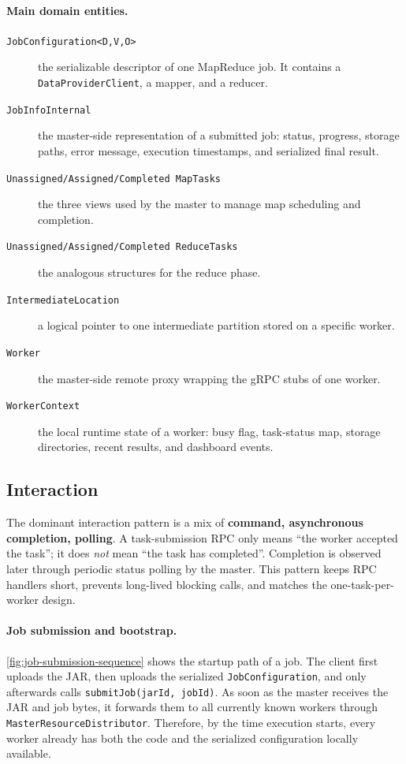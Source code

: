 \documentclass{scrartcl}
\begin{document}
\paragraph{Main domain entities.}
%
\begin{description}
    \item[\texttt{JobConfiguration<D,V,O>}] the serializable descriptor of one MapReduce job. It contains a \texttt{DataProviderClient}, a mapper, and a reducer.
    \item[\texttt{JobInfoInternal}] the master-side representation of a submitted job: status, progress, storage paths, error message, execution timestamps, and serialized final result.
    \item[\texttt{Unassigned/Assigned/Completed MapTasks}] the three views used by the master to manage map scheduling and completion.
    \item[\texttt{Unassigned/Assigned/Completed ReduceTasks}] the analogous structures for the reduce phase.
    \item[\texttt{IntermediateLocation}] a logical pointer to one intermediate partition stored on a specific worker.
    \item[\texttt{Worker}] the master-side remote proxy wrapping the gRPC stubs of one worker.
    \item[\texttt{WorkerContext}] the local runtime state of a worker: busy flag, task-status map, storage directories, recent results, and dashboard events.
\end{description}

\subsection{Interaction}\label{interaction}
The dominant interaction pattern is a mix of \textbf{command, asynchronous completion, polling}. A task-submission RPC only means ``the worker accepted the task''; it does \emph{not} mean ``the task has completed''. Completion is observed later through periodic status polling by the master. This pattern keeps RPC handlers short, prevents long-lived blocking calls, and matches the one-task-per-worker design.

\paragraph{Job submission and bootstrap.}
\cref{fig:job-submission-sequence} shows the startup path of a job. The client first uploads the JAR, then uploads the serialized \texttt{JobConfiguration}, and only afterwards calls \texttt{submitJob(jarId, jobId)}. As soon as the master receives the JAR and job bytes, it forwards them to all currently known workers through \texttt{MasterResourceDistributor}. Therefore, by the time execution starts, every worker already has both the code and the serialized configuration locally available.
\end{document}
